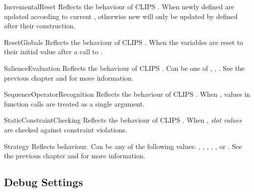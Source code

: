 \begin{memberdesc}[property]{IncrementalReset}
Reflects the behaviour of CLIPS . When
 newly defined  are updated according to
current , otherwise new  will only be updated by
 defined after their construction.
\end{memberdesc}

\begin{memberdesc}[property]{ResetGlobals}
Reflects the behaviour of CLIPS . When
 the  variables are reset to their initial
value after a call to .
\end{memberdesc}

\begin{memberdesc}[property]{SalienceEvaluation}
Reflects the behaviour of CLIPS . Can
be one of , ,
. See the previous chapter and \clipsapg{} for
more information.
\end{memberdesc}

\begin{memberdesc}[property]{SequenceOperatorRecognition}
Reflects the behaviour of CLIPS
. When ,
 values in function calls are treated as a single
argument.
\end{memberdesc}

\begin{memberdesc}[property]{StaticConstraintChecking}
Reflects the behaviour of CLIPS .
When , \emph{slot values} are checked against constraint
violations.
\end{memberdesc}

\begin{memberdesc}[property]{Strategy}
Reflects  behaviour. Can be any of the following
values: , ,
, ,
,  or
. See the previous chapter and \clipsapg{} for
more information.
\end{memberdesc}


\subsection{Debug Settings\label{pyclips-cl-statusconf-debug}}

